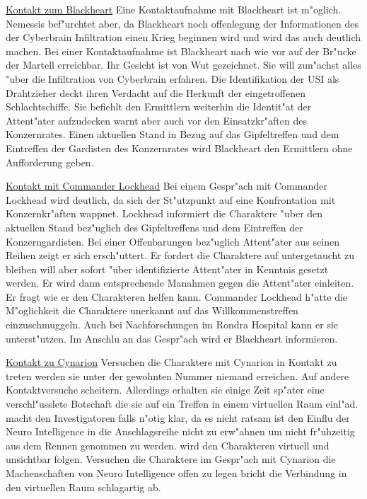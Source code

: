 \underline{Kontakt zum Blackheart} Eine Kontaktaufnahme mit Blackheart ist m"oglich. Nemessis bef"urchtet aber, da\3 Blackheart noch offenlegung der Informationen des der Cyberbrain Infiltration einen Krieg beginnen wird und wird das auch deutlich machen. Bei einer Kontaktaufnahme ist Blackheart nach wie vor auf der Br"ucke der Martell erreichbar. Ihr Gesicht ist von Wut gezeichnet. Sie will zun"achst alles "uber die Infiltration von Cyberbrain erfahren. Die Identifikation der USI als Drahtzieher deckt ihren Verdacht auf die Herkunft der eingetroffenen Schlachtschiffe. Sie befiehlt den Ermittlern weiterhin die Identit"at der Attent"ater aufzudecken warnt aber auch vor den Einsatzkr"aften des Konzernrates. Einen aktuellen Stand in Bezug auf das Gipfeltreffen und dem Eintreffen der Gardisten des Konzernrates wird Blackheart den Ermittlern ohne Aufforderung geben.

\underline{Kontakt mit Commander Lockhead} Bei einem Gespr"ach mit Commander Lockhead wird deutlich, da\3 sich der St"utzpunkt auf eine Konfrontation mit Konzernkr"aften wappnet. Lockhead informiert die Charaktere "uber den aktuellen Stand bez"uglich des Gipfeltreffens und dem Eintreffen der Konzerngardisten. Bei einer Offenbarungen bez"uglich Attent"ater aus seinen Reihen zeigt er sich ersch"uttert. Er fordert die Charaktere auf untergetaucht zu bleiben will aber sofort "uber identifizierte Attent"ater in Kenntnis gesetzt werden. Er wird dann entsprechende Ma\3nahmen gegen die Attent"ater einleiten. Er fragt wie er den Charakteren helfen kann. Commander Lockhead h"atte die M"oglichkeit die Charaktere unerkannt auf das Willkommenstreffen einzuschmuggeln. Auch bei Nachforschungen im Rondra Hospital kann er sie unterst"utzen. Im Anschlu\3 an das Gespr"ach wird er Blackheart informieren.

\underline{Kontakt zu Cynarion} Versuchen die Charaktere mit Cynarion in Kontakt zu treten werden sie unter der gewohnten Nummer niemand erreichen. Auf andere Kontaktversuche scheitern. Allerdings erhalten sie einige Zeit sp"ater eine verschl"usslete Botschaft die sie auf ein Treffen in einem virtuellen Raum einl"ad. \xl{} macht den Investigatoren falls n"otig klar, da\3 es nicht ratsam ist den Einflu\3 der Neuro Intelligence in die Anschlagsreihe nicht zu erw"ahnen um nicht fr"uhzeitig aus dem Rennen genommen zu werden. \xl{} wird den Charakteren virtuell und unsichtbar folgen. Versuchen die Charaktere im Gespr"ach mit Cynarion die Machenschaften von Neuro Intelligence offen zu legen bricht die Verbindung in den virtuellen Raum schlagartig ab. 

